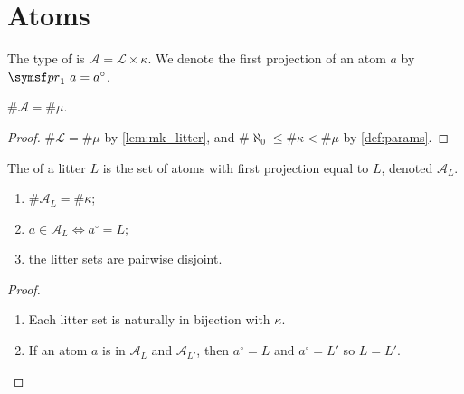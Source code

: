 \section{Atoms}

\begin{definition}
    The type of  is \( \mathcal A = \mathcal L \times \kappa \).
    We denote the first projection of an atom \( a \) by \( \pr_1\ a = a^\circ \).
\end{definition}
\begin{lemma}
    \label{lem:mk_atom}
    \( \#\mathcal A = \#\mu \).
\end{lemma}
\begin{proof}
    \( \#\mathcal L = \#\mu \) by \cref{lem:mk_litter}, and \( \#\aleph_0 \leq \#\kappa < \#\mu \) by \cref{def:params}.
\end{proof}
\begin{definition}
    The  of a litter \( L \) is the set of atoms with first projection equal to \( L \), denoted \( \mathcal A_L \).
\end{definition}
\begin{lemma}
    \label{lem:litterSet}
    \begin{enumerate}
        \item \( \#\mathcal A_L = \#\kappa \);
        \item \( a \in \mathcal A_L \Leftrightarrow a^\circ = L \);
        \item the litter sets are pairwise disjoint.
    \end{enumerate}
\end{lemma}
\begin{proof}
    \begin{enumerate}
        \item Each litter set is naturally in bijection with \( \kappa \).
        \item If an atom \( a \) is in \( \mathcal A_L \) and \( \mathcal A_{L'} \), then \( a^\circ = L \) and \( a^\circ = L' \) so \( L = L' \).
    \end{enumerate}
\end{proof}
